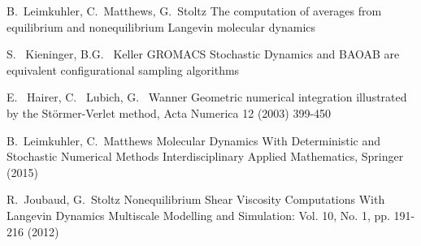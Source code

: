 \begin{thebibliography}{10}
    B.~Leimkuhler, C.~Matthews, G.~Stoltz
    \newblock The computation of averages from equilibrium and nonequilibrium Langevin molecular dynamics
  
    S. ~Kieninger, B.G. ~Keller
    \newblock GROMACS Stochastic Dynamics and BAOAB are equivalent configurational sampling algorithms
  
    E. ~Hairer, C. ~Lubich, G. ~Wanner
    \newblock Geometric numerical integration illustrated by the Störmer-Verlet method,
    \newblock Acta Numerica 12 (2003) 399-450

    B.~Leimkuhler, C.~Matthews
    \newblock Molecular Dynamics With Deterministic and Stochastic Numerical Methods
    \newblock Interdisciplinary Applied Mathematics, Springer (2015)

    R.~Joubaud, G.~Stoltz
    \newblock Nonequilibrium Shear Viscosity Computations With Langevin Dynamics
    \newblock Multiscale Modelling and Simulation: Vol. 10, No. 1, pp. 191-216 (2012)
  \end{thebibliography}